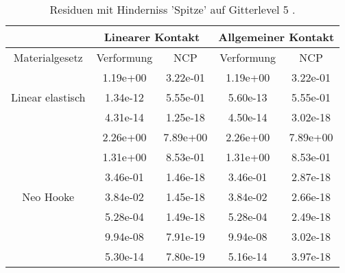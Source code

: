 \begin{table} 
\centering 
\begin{tabular}{c|cc|cc|} 
\cline{2-5} 
 & \multicolumn{2}{|c|}{Linearer Kontakt} & \multicolumn{2}{|c|}{Allgemeiner Kontakt} \\ 
\hline 
\multicolumn{1}{|c|}{Materialgesetz} & \multicolumn{1}{c|}{Verformung} & \multicolumn{1}{c|}{NCP} & \multicolumn{1}{c|}{Verformung} & \multicolumn{1}{c|}{NCP} \\ 
\hline 
\multicolumn{1}{|c|}{\multirow{3}{*}{Linear elastisch}} &\multicolumn{1}{|c|}{  1.19e+00} & \multicolumn{1}{|c|}{  3.22e-01} & \multicolumn{1}{|c|}{  1.19e+00} & \multicolumn{1}{|c|}{  3.22e-01} \\ 
\multicolumn{1}{|c|}{} & \multicolumn{1}{|c|}{  1.34e-12} & \multicolumn{1}{|c|}{  5.55e-01} & \multicolumn{1}{|c|}{  5.60e-13} & \multicolumn{1}{|c|}{  5.55e-01} \\ 
\multicolumn{1}{|c|}{} & \multicolumn{1}{|c|}{  4.31e-14} & \multicolumn{1}{|c|}{  1.25e-18} & \multicolumn{1}{|c|}{  4.50e-14} & \multicolumn{1}{|c|}{  3.02e-18} \\ 
\hline 
\multicolumn{1}{|c|}{\multirow{7}{*}{Neo Hooke}} &\multicolumn{1}{|c|}{  2.26e+00} & \multicolumn{1}{|c|}{  7.89e+00} & \multicolumn{1}{|c|}{  2.26e+00} & \multicolumn{1}{|c|}{  7.89e+00} \\ 
\multicolumn{1}{|c|}{} & \multicolumn{1}{|c|}{  1.31e+00} & \multicolumn{1}{|c|}{  8.53e-01} & \multicolumn{1}{|c|}{  1.31e+00} & \multicolumn{1}{|c|}{  8.53e-01} \\ 
\multicolumn{1}{|c|}{} & \multicolumn{1}{|c|}{  3.46e-01} & \multicolumn{1}{|c|}{  1.46e-18} & \multicolumn{1}{|c|}{  3.46e-01} & \multicolumn{1}{|c|}{  2.87e-18} \\ 
\multicolumn{1}{|c|}{} & \multicolumn{1}{|c|}{  3.84e-02} & \multicolumn{1}{|c|}{  1.45e-18} & \multicolumn{1}{|c|}{  3.84e-02} & \multicolumn{1}{|c|}{  2.66e-18} \\ 
\multicolumn{1}{|c|}{} & \multicolumn{1}{|c|}{  5.28e-04} & \multicolumn{1}{|c|}{  1.49e-18} & \multicolumn{1}{|c|}{  5.28e-04} & \multicolumn{1}{|c|}{  2.49e-18} \\ 
\multicolumn{1}{|c|}{} & \multicolumn{1}{|c|}{  9.94e-08} & \multicolumn{1}{|c|}{  7.91e-19} & \multicolumn{1}{|c|}{  9.94e-08} & \multicolumn{1}{|c|}{  3.02e-18} \\ 
\multicolumn{1}{|c|}{} & \multicolumn{1}{|c|}{  5.30e-14} & \multicolumn{1}{|c|}{  7.80e-19} & \multicolumn{1}{|c|}{  5.16e-14} & \multicolumn{1}{|c|}{  3.97e-18} \\ 
\hline 
\end{tabular}\caption{Residuen mit Hinderniss 'Spitze' auf Gitterlevel 5 .}\label{tab:Residuum_Spitze_level5}
\end{table} 
